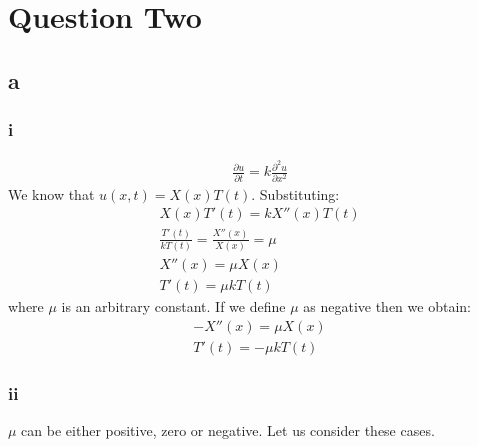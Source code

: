 \documentclass[11pt]{article}
\numberwithin{equation}{section}
\begin{document}
\section{Question Two}
\subsection*{a}
\subsubsection*{i}
\begin{align}
	\frac{\partial u}{\partial t} = k \frac{\partial^2 u}{\partial x^2}\label{PDEq2ai}
\end{align}
We know that $u(x,t) = X(x)T(t)$. Substituting:
\begin{gather}
	X\left(x\right) T'\left(t\right) = kX''\left(x\right)T\left(t\right)\\
	\frac{T'\left(t\right)}{kT\left(t\right)} = \frac{X''\left(x\right)}{X\left(x\right)} = \mu \\
	X''\left(x\right) = \mu X\left(x\right)\\
	T'\left(t\right) = \mu k T\left(t\right)
\end{gather}
where $\mu$ is an arbitrary constant. If we define $\mu$ as negative then we obtain:
\begin{align}
	-X''\left(x\right) = \mu X\left(x\right)\\
	T'\left(t\right) = -\mu k T\left(t\right)
\end{align}
\subsubsection*{ii}
$\mu$ can be either positive, zero or negative. Let us consider these cases. 
\end{document}
